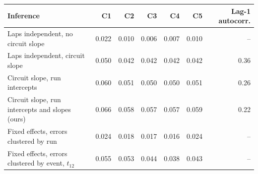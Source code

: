 \begin{tabular}{@{}lrrrrrr@{}}
\toprule
Inference & C1 & C2 & C3 & C4 & C5 & Lag-1 autocorr. \\
\midrule
Laps independent, no circuit slope & 0.022 & 0.010 & 0.006 & 0.007 & 0.010 & -- \\
Laps independent, circuit slope & 0.050 & 0.042 & 0.042 & 0.042 & 0.042 & 0.36 \\
Circuit slope, run intercepts & 0.060 & 0.051 & 0.050 & 0.050 & 0.051 & 0.26 \\
Circuit slope, run intercepts and slopes (ours) & 0.066 & 0.058 & 0.057 & 0.057 & 0.059 & 0.22 \\
Fixed effects, errors clustered by run & 0.024 & 0.018 & 0.017 & 0.016 & 0.024 & -- \\
Fixed effects, errors clustered by event, $t_{12}$ & 0.055 & 0.053 & 0.044 & 0.038 & 0.043 & -- \\
\bottomrule
\end{tabular}
